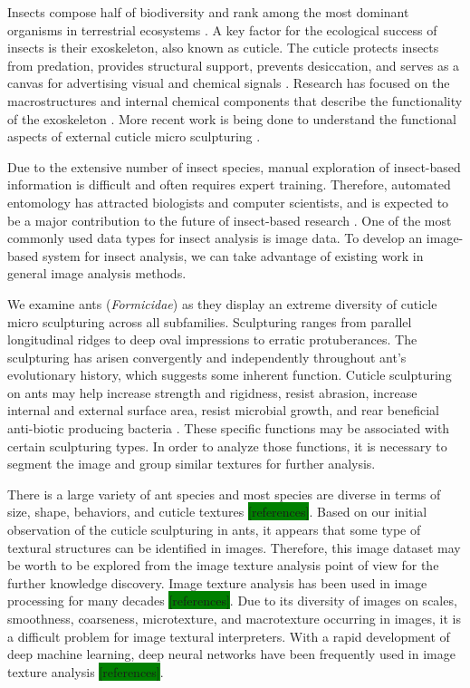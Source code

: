 \documentclass{aci}
\numberwithin{equation}{section}
\begin{document}
Insects compose half of biodiversity and rank among the most dominant organisms
in terrestrial ecosystems \cite{sheikh_diverse_2017}. A key factor for the
ecological success of insects is their exoskeleton, also known as cuticle. The
cuticle protects insects from predation, provides structural support, prevents
desiccation, and serves as a canvas for advertising visual and chemical signals
\cite{gullan_insects_2009}. Research has focused on the macrostructures and
internal chemical components that describe the functionality of the exoskeleton
\cite{gunderson_insect_1989}. More recent work is being done to understand the
functional aspects of external cuticle micro sculpturing
\cite{muthukrishnan_insect_2020, watson_diversity_2017}.

Due to the extensive number of insect species, manual exploration of
insect-based information is difficult and often requires expert training.
Therefore, automated entomology has attracted biologists and computer
scientists, and is expected to be a major contribution to the future of
insect-based research \cite{martineau_survey_2017}. One of the most commonly
used data types for insect analysis is image data. To develop an image-based
system for insect analysis, we can take advantage of existing work in general
image analysis methods.

We examine ants (\textit{Formicidae}) as they display an extreme diversity of
cuticle micro sculpturing across all subfamilies. Sculpturing ranges from
parallel longitudinal ridges to deep oval impressions to erratic protuberances.
The sculpturing has arisen convergently and independently throughout ant's
evolutionary history, which suggests some inherent function. Cuticle sculpturing
on ants may help increase strength and rigidness, resist abrasion, increase
internal and external surface area, resist microbial growth, and rear beneficial
anti-biotic producing bacteria \cite{johnson_effect_2011,
    bruckner_relationship_2017, currie_coevolved_2006}. These specific functions may
be associated with certain sculpturing types. In order to analyze those
functions, it is necessary to segment the image and group similar textures for
further analysis.

There is a large variety of ant species and most species are diverse in terms of
size, shape, behaviors, and cuticle textures \colorbox{green}{[references]}.
Based on our initial observation of the cuticle sculpturing in ants, it appears
that some type of textural structures can be identified in images. Therefore,
this image dataset may be worth to be explored from the image texture analysis
point of view for the further knowledge discovery. Image texture analysis has
been used in image processing for many decades \colorbox{green}{[references]}. Due to its
diversity of images on scales, smoothness, coarseness, microtexture, and
macrotexture occurring in images, it is a difficult problem for image textural
interpreters. With a rapid development of deep machine learning, deep neural
networks have been frequently used in image texture analysis \colorbox{green}{[references]}.
\end{document}
